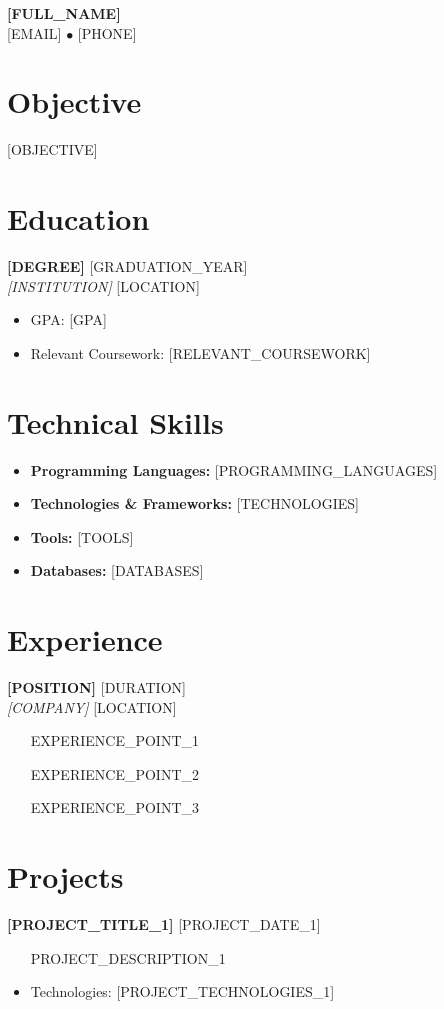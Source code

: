 \documentclass[11pt,a4paper]{article}
\newcommand{\resumeheader}[4]{
    \begin{center}
        {\Large\textbf{#1}} \\
        \vspace{0.2cm}
        #2 $\bullet$ #3 \\
        #4
    \end{center}
    \vspace{0.3cm}
}
\newcommand{\resumeentry}[4]{
    \textbf{#1} \hfill #2 \\
    \textit{#3} \hfill #4 \\
    \vspace{0.1cm}
}
\newcommand{\resumesubentry}[2]{
    \textbf{#1} \hfill #2 \\
    \vspace{0.1cm}
}
\begin{document}
\resumeheader{[FULL_NAME]}{[EMAIL]}{[PHONE]}{[ADDRESS]}

\section{Objective}
[OBJECTIVE]

\section{Education}
\resumeentry{[DEGREE]}{[GRADUATION_YEAR]}{[INSTITUTION]}{[LOCATION]}
\begin{itemize}[leftmargin=0.2in]
    \item GPA: [GPA]
    \item Relevant Coursework: [RELEVANT_COURSEWORK]
\end{itemize}

\section{Technical Skills}
\begin{itemize}[leftmargin=0.2in]
    \item \textbf{Programming Languages:} [PROGRAMMING_LANGUAGES]
    \item \textbf{Technologies \& Frameworks:} [TECHNOLOGIES]
    \item \textbf{Tools:} [TOOLS]
    \item \textbf{Databases:} [DATABASES]
\end{itemize}

\section{Experience}
\resumeentry{[POSITION]}{[DURATION]}{[COMPANY]}{[LOCATION]}
\begin{itemize}[leftmargin=0.2in]
    \item [EXPERIENCE_POINT_1]
    \item [EXPERIENCE_POINT_2]
    \item [EXPERIENCE_POINT_3]
\end{itemize}

\section{Projects}
\resumesubentry{[PROJECT_TITLE_1]}{[PROJECT_DATE_1]}
\begin{itemize}[leftmargin=0.2in]
    \item [PROJECT_DESCRIPTION_1]
    \item Technologies: [PROJECT_TECHNOLOGIES_1]
\end{itemize}
\end{document}
